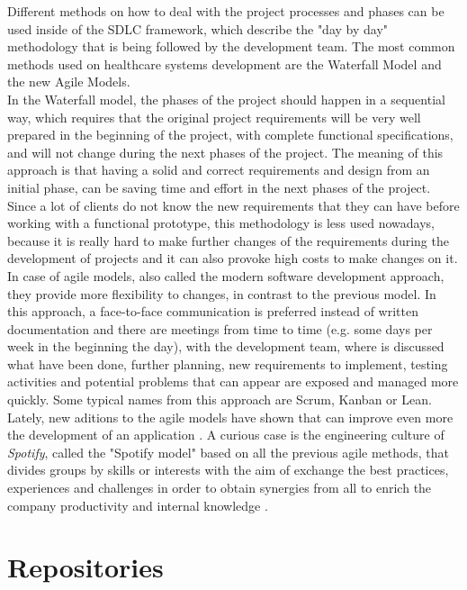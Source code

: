 \documentclass[mim_thesis.tex]{subfiles}
\begin{document}
Different methods on how to deal with the project processes and phases can be used inside of the SDLC framework, which describe the "day by day" methodology that is being followed by the development team. The most common methods used on healthcare systems development are the Waterfall Model and the new Agile Models. \citep{wilcox2014software}\\

In the Waterfall model, the phases of the project should happen in a sequential way, which requires that the original project requirements will be very well prepared in the beginning of the project, with complete functional specifications, and will not change during the next phases of the project. The meaning of this approach is that having a solid and correct requirements and design from an initial phase, can be saving time and effort in the next phases of the project. Since a lot of clients do not know the new requirements that they can have before working with a functional prototype, this methodology is less used nowadays, because it is really hard to make further changes of the requirements during the development of projects and it can also provoke high costs to make changes on it.\\ 

In case of agile models, also called the modern software development approach, they provide more flexibility to changes, in contrast to the previous model. In this approach, a face-to-face communication is preferred instead of written documentation and there are meetings from time to time (e.g. some days per week in the beginning the day), with the development team, where is discussed what have been done, further planning, new requirements to implement, testing activities and potential problems that can appear are exposed and managed more quickly. Some typical names from this approach are Scrum, Kanban or Lean. \\

Lately, new aditions to the agile models have shown that can improve even more the development of an application \citep{spotify2017}. A curious case is the engineering culture of \textit{Spotify}, called the "Spotify model" based on all the previous agile methods, that divides groups by skills or interests with the aim of exchange the best practices, experiences and challenges in order to obtain synergies from all to enrich the company productivity and internal knowledge \citep{spotify2012}.
\\


\section{Repositories}
\end{document}
